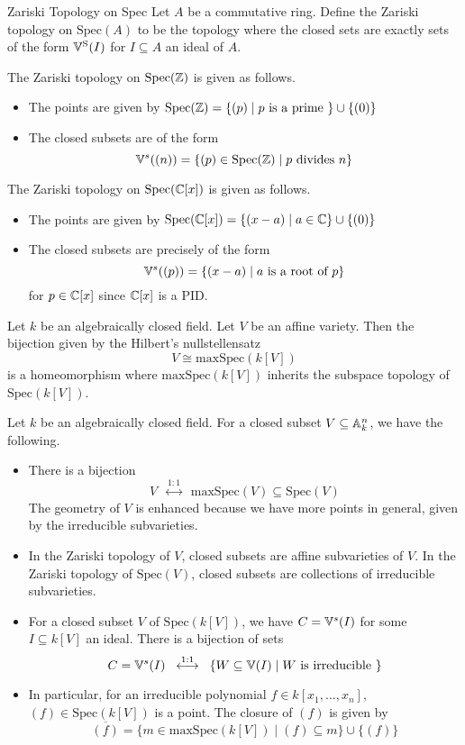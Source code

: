\documentclass[a4paper]{article}
\begin{document}
\begin{defn}{Zariski Topology on Spec}{} Let $A$ be a commutative ring. Define the Zariski topology on $\text{Spec}(A)$ to be the topology where the closed sets are exactly sets of the form $\mathbb{V}^\text{S}(I)$ for $I\subseteq A$ an ideal of $A$. 
\end{defn}

\begin{eg}{}{} The Zariski topology on $\text{Spec}(\mathbb{Z})$ is given as follows. 
\begin{itemize}
\item The points are given by $\text{Spec}(\mathbb{Z})=\{(p)\;|\;p\text{ is a prime }\}\cup\{(0)\}$
\item The closed subsets are of the form $$\mathbb{V}^s((n))=\{(p)\in\text{Spec}(\mathbb{Z})\;|\;p\text{ divides }n\}$$
\end{itemize}
\end{eg}

\begin{eg}{}{} The Zariski topology on $\text{Spec}(\mathbb{C}[x])$ is given as follows. 
\begin{itemize}
\item The points are given by $\text{Spec}(\mathbb{C}[x])=\{(x-a)\;|\;a\in\mathbb{C}\}\cup\{(0)\}$
\item The closed subsets are precisely of the form $$\mathbb{V}^s((p))=\{(x-a)\;|\;a\text{ is a root of }p\}$$ for $p\in\mathbb{C}[x]$ since $\mathbb{C}[x]$ is a PID. 
\end{itemize}
\end{eg}

\begin{lmm}{}{} Let $k$ be an algebraically closed field. Let $V$ be an affine variety. Then the bijection given by the Hilbert's nullstellensatz $$V\cong\text{maxSpec}(k[V])$$ is a homeomorphism where $\text{maxSpec}(k[V])$ inherits the subspace topology of $\text{Spec}(k[V])$. 
\end{lmm}

Let $k$ be an algebraically closed field. For a closed subset $V\subseteq\mathbb{A}_k^n$, we have the following. 

\begin{itemize}
\item There is a bijection $$V\;\;\overset{1:1}{\longleftrightarrow}\;\;\text{maxSpec}(V)\subseteq\text{Spec}(V)$$ The geometry of $V$ is enhanced because we have more points in general, given by the irreducible subvarieties. 
\item In the Zariski topology of $V$, closed subsets are affine subvarieties of $V$. In the Zariski topology of $\text{Spec}(V)$, closed subsets are collections of irreducible subvarieties. 
\item For a closed subset $V$ of $\text{Spec}(k[V])$, we have $C=\mathbb{V}^s(I)$ for some $I\subseteq k[V]$ an ideal. There is a bijection of sets $$C=\mathbb{V}^s(I)\;\;\overset{1:1}{\longleftrightarrow}\;\;\{W\subseteq\mathbb{V}(I)\;|\;W\text{ is irreducible }\}$$
\item In particular, for an irreducible polynomial $f\in k[x_1,\dots,x_n]$, $(f)\in\text{Spec}(k[V])$ is a point. The closure of $(f)$ is given by $$\overline{(f)}=\{m\in\text{maxSpec}(k[V])\;|\;(f)\subseteq m\}\cup\{(f)\}$$
\end{itemize}
\end{document}
